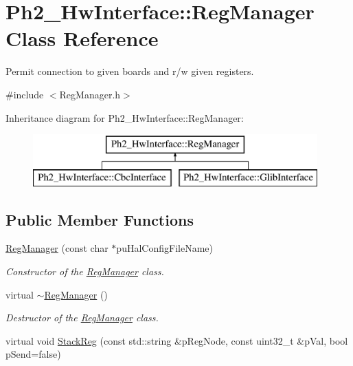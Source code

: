 \hypertarget{class_ph2___hw_interface_1_1_reg_manager}{\section{Ph2\-\_\-\-Hw\-Interface\-:\-:Reg\-Manager Class Reference}
\label{class_ph2___hw_interface_1_1_reg_manager}
}


Permit connection to given boards and r/w given registers.  




{\ttfamily \#include $<$Reg\-Manager.\-h$>$}

Inheritance diagram for Ph2\-\_\-\-Hw\-Interface\-:\-:Reg\-Manager\-:\begin{figure}[H]
\begin{center}
\leavevmode
\includegraphics[height=2.000000cm]{class_ph2___hw_interface_1_1_reg_manager}
\end{center}
\end{figure}
\subsection*{Public Member Functions}
\begin{DoxyCompactItemize}
\item 
\hyperlink{class_ph2___hw_interface_1_1_reg_manager_a938f6b582b1fffcb478f35fd9d81954f}{Reg\-Manager} (const char $\ast$pu\-Hal\-Config\-File\-Name)
\begin{DoxyCompactList}\small\item\em Constructor of the \hyperlink{class_ph2___hw_interface_1_1_reg_manager}{Reg\-Manager} class. \end{DoxyCompactList}\item 
virtual \hyperlink{class_ph2___hw_interface_1_1_reg_manager_a5d650c4e6467153f98f999abbbfc354c}{$\sim$\-Reg\-Manager} ()
\begin{DoxyCompactList}\small\item\em Destructor of the \hyperlink{class_ph2___hw_interface_1_1_reg_manager}{Reg\-Manager} class. \end{DoxyCompactList}\item 
virtual void \hyperlink{class_ph2___hw_interface_1_1_reg_manager_a409c95948e25ea5fb7f897926e9de1e6}{Stack\-Reg} (const std\-::string \&p\-Reg\-Node, const uint32\-\_\-t \&p\-Val, bool p\-Send=false)
\end{DoxyCompactItemize}
